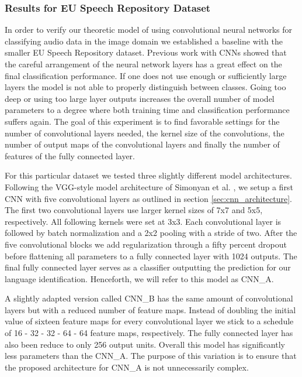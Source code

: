 \subsubsection{Results for EU Speech Repository Dataset}
\label{sec:results_eu}
In order to verify our theoretic model of using convolutional neural networks for classifying audio data in the image domain we established a baseline with the smaller EU Speech Repository dataset. Previous work with CNNs showed that the careful arrangement of the neural network layers has a great effect on the final classification performance. If one does not use enough or sufficiently large layers the model is not able to properly distinguish between classes. Going too deep or using too large layer outputs increases the overall number of model parameters to a degree where both training time and classification performance suffers again. The goal of this experiment is to find favorable settings for the number of convolutional layers needed, the kernel size of the convolutions, the number of output maps of the convolutional layers and finally the number of features of the fully connected layer.

For this particular dataset we tested three slightly different model architectures. Following the VGG-style model architecture of Simonyan et al. \cite{Chatfield14}, we setup a first CNN with five convolutional layers as outlined in section \ref{sec:cnn_architecture}. The first two convolutional layers use larger kernel sizes of 7x7 and 5x5, respectively. All following kernels were set at 3x3. Each convolutional layer is followed by batch normalization and a 2x2 pooling with a stride of two. After the five convolutional blocks we add regularization through a fifty percent dropout before flattening all parameters to a fully connected layer with 1024 outputs. The final fully connected layer serves as a classifier outputting the prediction for our language identification. Henceforth, we will refer to this model as CNN\_A.

A slightly adapted version called CNN\_B has the same amount of convolutional layers but with a reduced number of feature maps. Instead of doubling the initial value of sixteen feature maps for every convolutional layer we stick to a schedule of 16 - 32 - 32 - 64 - 64 feature maps, respectively. The fully connected layer has also been reduce to only 256 output units. Overall this model has significantly less parameters than the CNN\_A. The purpose of this variation is to ensure that the proposed architecture for CNN\_A is not unnecessarily complex.
	
